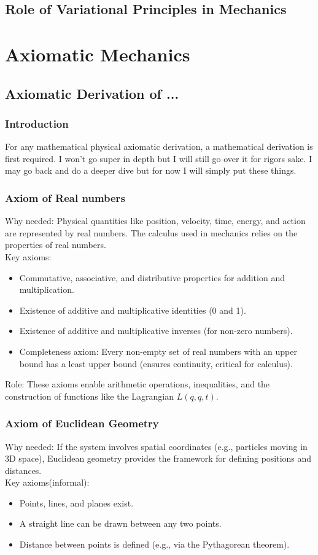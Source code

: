 \subsection{Role of Variational Principles in Mechanics}
\section{Axiomatic Mechanics}
\subsection{Axiomatic Derivation of ... }
\subsubsection{Introduction}
\par For any mathematical physical axiomatic derivation, a mathematical derivation is first required. I won't go super in depth but I will still go over it for rigors sake. I may go back and do a deeper dive but for now I will simply put these things.
\subsubsection{Axiom of Real numbers}
Why needed: Physical quantities like position, velocity, time, energy, and action are represented by real numbers. The calculus used in mechanics relies on the properties of real numbers.
\\
Key axioms:
\begin{itemize}
    \item Commutative, associative, and distributive properties for addition and multiplication. 
    \item Existence of additive and multiplicative identities (0 and 1).
    \item Existence of additive and multiplicative inverses (for non-zero numbers).
    \item Completeness axiom: Every non-empty set of real numbers with an upper bound has a least upper bound (ensures continuity, critical for calculus).
\end{itemize}



Role: These axioms enable arithmetic operations, inequalities, and the construction of functions like the Lagrangian $ L(q, \dot{q}, t) $.

\subsubsection{Axiom of Euclidean Geometry}
Why needed: If the system involves spatial coordinates (e.g., particles moving in 3D space), Euclidean geometry provides the framework for defining positions and distances.
\\
Key axioms(informal):
\begin{itemize}
    \item Points, lines, and planes exist.
    \item A straight line can be drawn between any two points.
    \item Distance between points is defined (e.g., via the Pythagorean theorem).
\end{itemize}


